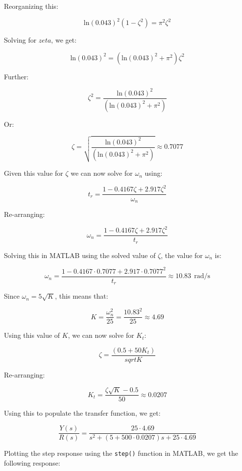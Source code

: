 \documentclass[12pt, letterpaper]{../assignment}
\begin{document}
Reorganizing this:

$$ \text{ln}(0.043)^2 (1 - \zeta^2) = \pi^2 \zeta^2 $$

Solving for $zeta$, we get:

$$ \text{ln}(0.043)^2 = (\text{ln}(0.043)^2 + \pi^2) \zeta^2 $$

Further:

$$ \zeta^2 = \frac{\text{ln}(0.043)^2}{(\text{ln}(0.043)^2 + \pi^2)} $$

Or:

$$ \zeta = \sqrt{\frac{\text{ln}(0.043)^2}{(\text{ln}(0.043)^2 + \pi^2)}} \approx 0.7077 $$

Given this value for $\zeta$ we can now solve for $\omega_n$ using:

$$ t_r = \frac{ 1 - 0.4167 \zeta + 2.917 \zeta^2 }{\omega_n} $$

Re-arranging:

$$ \omega_n = \frac{ 1 - 0.4167 \zeta + 2.917 \zeta^2 }{t_r} $$

Solving this in MATLAB using the solved value of $\zeta$, the value for $\omega_n$ is:

$$ \omega_n = \frac{ 1 - 0.4167 \cdot 0.7077 + 2.917 \cdot 0.7077^2 }{t_r} \approx 10.83\ \ \text{rad/s} $$

Since $ \omega_n  = 5 \sqrt{K} $, this means that:
\begin{answer}
$$ K = \frac{\omega_n ^2}{25} = \frac{10.83 ^2}{25} \approx 4.69 $$
\end{answer}

Using this value of $K$, we can now solve for $K_t$:

$$ \zeta =  \frac{(0.5 + 50 K_t)}{sqrt{K}} $$

Re-arranging:
\begin{answer}
$$ K_t = \frac{\zeta \sqrt{K} - 0.5}{50} \approx 0.0207 $$
\end{answer}

Using this to populate the transfer function, we get:

\begin{answer}
$$ \frac{Y(s)}{R(s)} =  \frac{25 \cdot 4.69 }{ s^2 + (5 + 500 \cdot 0.0207) s + 25 \cdot 4.69 } $$
\end{answer}

Plotting the step response using the \texttt{step()} function in MATLAB, we get the following response:
\end{document}
